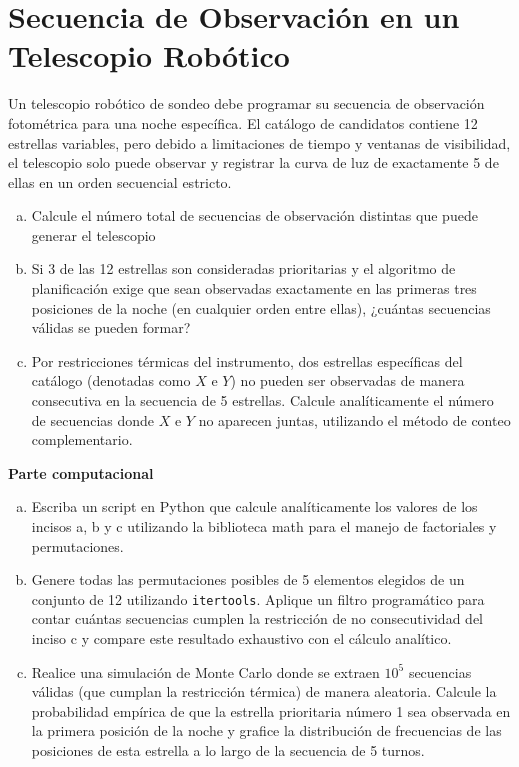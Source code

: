 \documentclass[a4paper]{article}
\begin{document}
\section{Secuencia de Observación en un Telescopio Robótico}
\label{sec:problema-26}

Un telescopio robótico de sondeo debe programar su secuencia de observación fotométrica para una noche específica. El catálogo de candidatos contiene 12 estrellas variables, pero debido a limitaciones de tiempo y ventanas de visibilidad, el telescopio solo puede observar y registrar la curva de luz de exactamente 5 de ellas en un orden secuencial estricto.

\begin{enumerate}[a)]
\item Calcule el número total de secuencias de observación distintas que puede generar el telescopio
\item Si 3 de las 12 estrellas son consideradas prioritarias y el algoritmo de planificación exige que sean observadas exactamente en las primeras tres posiciones de la noche (en cualquier orden entre ellas), ¿cuántas secuencias válidas se pueden formar?
\item Por restricciones térmicas del instrumento, dos estrellas específicas del catálogo (denotadas como $X$ e $Y$) no pueden ser observadas de manera consecutiva en la secuencia de 5 estrellas. Calcule analíticamente el número de secuencias donde $X$ e $Y$ no aparecen juntas, utilizando el método de conteo complementario.
\end{enumerate}

\textbf{Parte computacional}
\begin{enumerate}[a)]
\item Escriba un script en Python que calcule analíticamente los valores de los incisos a, b y c utilizando la biblioteca math para el manejo de factoriales y permutaciones.
\item Genere todas las permutaciones posibles de 5 elementos elegidos de un conjunto de 12 utilizando \texttt{itertools}. Aplique un filtro programático para contar cuántas secuencias cumplen la restricción de no consecutividad del inciso c y compare este resultado exhaustivo con el cálculo analítico.
\item Realice una simulación de Monte Carlo donde se extraen $10^5$ secuencias válidas (que cumplan la restricción térmica) de manera aleatoria. Calcule la probabilidad empírica de que la estrella prioritaria número 1 sea observada en la primera posición de la noche y grafice la distribución de frecuencias de las posiciones de esta estrella a lo largo de la secuencia de 5 turnos.
\end{enumerate}
\end{document}
